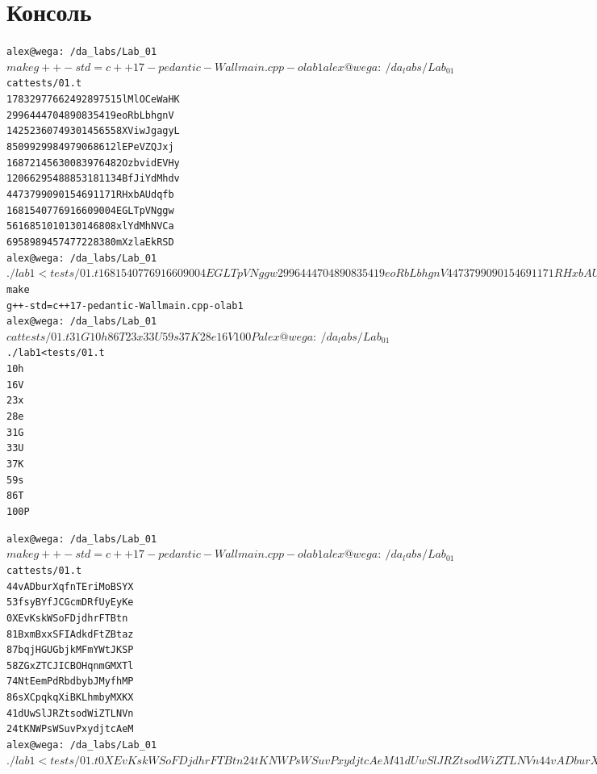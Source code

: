 \section{Консоль}
\begin{alltt}
alex@wega:~/da_labs/Lab_01$ make
g++ -std=c++17 -pedantic -Wall main.cpp -o lab1
alex@wega:~/da_labs/Lab_01$ cat tests/01.t
17832977662492897515    lMlOCeWaHK
2996444704890835419     eoRbLbhgnV
14252360749301456558    XViwJgagyL
8509929984979068612     lEPeVZQJxj
16872145630083976482    OzbvidEVHy
12066295488853181134    BfJiYdMhdv
4473799090154691171     RHxbAUdqfb
1681540776916609004     EGLTpVNggw
5616851010130146808     xlYdMhNVCa
6958989457477228380     mXzlaEkRSD
alex@wega:~/da_labs/Lab_01$ ./lab1 < tests/01.t
1681540776916609004     EGLTpVNggw
2996444704890835419     eoRbLbhgnV
4473799090154691171     RHxbAUdqfb
5616851010130146808     xlYdMhNVCa
6958989457477228380     mXzlaEkRSD
8509929984979068612     lEPeVZQJxj
12066295488853181134    BfJiYdMhdv
14252360749301456558    XViwJgagyL
16872145630083976482    OzbvidEVHy
17832977662492897515    lMlOCeWaHK

alex@wega:~/da_labs/Lab_01$ make
g++ -std=c++17 -pedantic -Wall main.cpp -o lab1
alex@wega:~/da_labs/Lab_01$ cat tests/01.t
31      G
10      h
86      T
23      x
33      U
59      s
37      K
28      e
16      V
100     P
alex@wega:~/da_labs/Lab_01$ ./lab1 < tests/01.t
10      h
16      V
23      x
28      e
31      G
33      U
37      K
59      s
86      T
100     P

alex@wega:~/da_labs/Lab_01$ make
g++ -std=c++17 -pedantic -Wall main.cpp -o lab1
alex@wega:~/da_labs/Lab_01$ cat tests/01.t
44      vADburXqfnTEriMoBSYX
53      fsyBYfJCGcmDRfUyEyKe
0       XEvKskWSoFDjdhrFTBtn
81      BxmBxxSFIAdkdFtZBtaz
87      bqjHGUGbjkMFmYWtJKSP
58      ZGxZTCJICBOHqnmGMXTl
74      NtEemPdRbdbybJMyfhMP
86      sXCpqkqXiBKLhmbyMXKX
41      dUwSlJRZtsodWiZTLNVn
24      tKNWPsWSuvPxydjtcAeM
alex@wega:~/da_labs/Lab_01$ ./lab1 < tests/01.t
0       XEvKskWSoFDjdhrFTBtn
24      tKNWPsWSuvPxydjtcAeM
41      dUwSlJRZtsodWiZTLNVn
44      vADburXqfnTEriMoBSYX
53      fsyBYfJCGcmDRfUyEyKe
58      ZGxZTCJICBOHqnmGMXTl
74      NtEemPdRbdbybJMyfhMP
81      BxmBxxSFIAdkdFtZBtaz
86      sXCpqkqXiBKLhmbyMXKX
87      bqjHGUGbjkMFmYWtJKSP
alex@wega:~/da_labs/Lab_01$
\end{alltt}
\pagebreak
